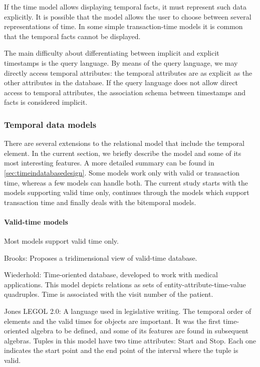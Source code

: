 	If the time model allows displaying temporal facts, it must represent such data explicitly. It is possible that the model allows the user to choose between several representations of time. In some simple transaction-time models it is common that the temporal facts cannot be displayed. 

	The main difficulty about differentiating between implicit and explicit timestamps is the query language. By means of the query language, we may directly access temporal attributes: the temporal attributes are as explicit as the other attributes in the database. If the query language does not allow direct access to temporal attributes, the association schema between timestamps and facts is considered implicit.
	
\subsubsection{\label{subsubsec:models}Temporal data models}
There are several extensions to the relational model that include the temporal element. In the current section, we briefly describe the model and some of its most interesting features. A more detailed summary can be found in \ref{sec:timeindatabasedesign}. Some models work only with valid or transaction time, whereas a few models can handle both. The current study starts with the models supporting valid time only, continues through the models which support transaction time and finally deals with the bitemporal models.

\paragraph{Valid-time models}
Most models support valid time only.

Brooks:  \cite{brooks56} Proposes a tridimensional view of valid-time database.

Wiederhold: \cite{Blum:1981:DCD:1672611.1672632} Time-oriented database, developed to work with medical applications. This model depicts relations as sets of entity-attribute-time-value quadruples. Time is associated with the visit number of the patient. 

Jones LEGOL 2.0: \cite{legol20} A language used in legislative writing. The temporal order of elements and the valid times for objects are important. It was the first time-oriented algebra to be defined, and some of its features are found in subsequent algebras.
Tuples in this model have two time attributes: Start and Stop. Each one indicates the start point and the end point of the interval where the tuple is valid.

